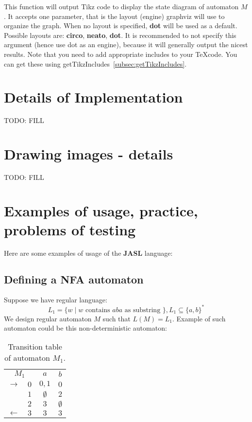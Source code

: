 \documentclass{ctuthesis}
\begin{document}
This function will output Tikz code to display the state diagram of automaton $M$. It accepts one parameter, that is the layout (engine) graphviz will use to organize the graph. When no layout is specified, \textbf{dot} will be used as a default. Possible layouts are: \textbf{circo}, \textbf{neato}, \textbf{dot}. It is recommended to not specify this argument (hence use dot as an engine), because it will generally output the nicest results. Note that you need to add appropriate includes to your \TeX code. You can get these using getTikzIncludes~\ref{subsec:getTikzIncludes}.

\chapter{Details of Implementation}
TODO: FILL

\chapter{Drawing images - details}
TODO: FILL

\chapter{Examples of usage, practice, problems of testing}
Here are some examples of usage of the \textbf{JASL} language: 

\section{Defining a NFA automaton}
Suppose we have regular language: 
\begin{equation*}
L_1 = \{w \mid w \text{ contains } aba \text{ as substring }\}, L_1 \subseteq \{a, b\}^*
\end{equation*} 
We design regular automaton $M$ such that $L(M) = L_1$. Example of such automaton could be this non-deterministic automaton:
\begin{table}[H]
\begin{ctucolortab}
\begin{tabular}{cc|cc}
\multicolumn{2}{c}{\bfseries $M_1$} & \bfseries $a$ & \bfseries $b$ \\\Midrule
$\rightarrow$ 	& $0$ & $0,1$ 	& $0$  \\
				& $1$ & $\emptyset$ 	& $2$  \\
				& $2$ & $3$		& $\emptyset$  \\
$\leftarrow$	& $3$ & $3$		& $3$ 
\end{tabular}
\end{ctucolortab}
\caption{Transition table of automaton $M_1$.}
\label{fig:examples_NFA_table}
\end{table} 
\end{document}
